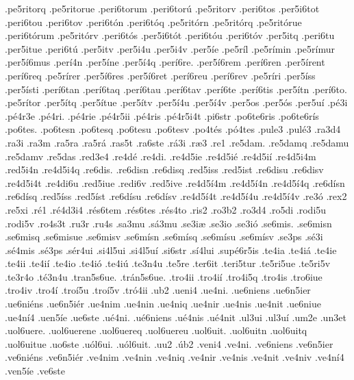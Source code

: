 {.pe5ritorq
.pe5ritorue
.peri6torum
.peri6tor^^fa
.pe5ritorv
.peri6tos
.per5i6tot
.peri6tou
.peri6tov
.peri6t^^f3n
.peri6t^^f3q
.pe5rit^^f3rn
.pe5rit^^f3rq
.pe5rit^^f3rue
.peri6t^^f3rum
.pe5rit^^f3rv
.peri6t^^f3s
.per5i6t^^f3t
.peri6t^^f3u
.peri6t^^f3v
.per5itq
.peri6tu
.per5itue
.peri6t^^fa
.per5itv
.per5i4u
.per5i4v
.per5^^ede
.pe5r^^edl
.pe5r^^edmin
.pe5r^^edmur
.per5^^ed6mus
.per^^ed4n
.per5^^edne
.per5^^ed4q
.per^^ed6re.
.per5^^ed6rem
.per^^ed6ren
.per5^^edrent
.per^^ed6req
.pe5r^^edrer
.per5^^ed6res
.per5^^ed6ret
.per^^ed6reu
.per^^ed6rev
.pe5r^^edri
.per5^^edss
.per5^^edsti
.per^^ed6tan
.per^^ed6taq
.per^^ed6tau
.per^^ed6tav
.per^^ed6te
.per^^ed6tis
.per5^^edtn
.per^^ed6to.
.pe5r^^edtor
.per5^^edtq
.per5^^edtue
.per5^^edtv
.per5^^ed4u
.per5^^ed4v
.per5os
.per5^^f3s
.per5u^^ed
.p^^e93i
.p^^e94r3e
.p^^e94ri.
.p^^e94rie
.p^^e94r5ii
.p^^e94ris
.p^^e94r5i4t
.pi6str
.po6te6ris
.po6te6r^^eds
.po6tes.
.po6tesn
.po6tesq
.po6tesu
.po6tesv
.po4t^^e9s
.p^^f34tes
.pule3
.pul^^e93
.ra3d4
.ra3i
.ra3m
.ra5ra
.ra5r^^e1
.ras5t
.ra6ste
.r^^e13i
.r^^e63
.re1
.re5dam.
.re5damq
.re5damu
.re5damv
.re5das
.red3e4
.re4d^^e9
.re4di.
.re4d5ie
.re4d5i^^e9
.re4d5i^^ed
.re4d5i4m
.red5i4n
.re4d5i4q
.re6dis.
.re6disn
.re6disq
.red5iss
.red5ist
.re6disu
.re6disv
.re4d5i4t
.re4di6u
.red5iue
.redi6v
.red5ive
.re4d5^^ed4m
.re4d5^^ed4n
.re4d5^^ed4q
.re6d^^edsn
.re6d^^edsq
.red5^^edss
.red5^^edst
.re6d^^edsu
.re6d^^edsv
.re4d5^^ed4t
.re4d5^^ed4u
.re4d5^^ed4v
.re3^^f3
.rex2
.re5xi
.r^^e91
.r^^e94d3i4
.r^^e9s6tem
.r^^e9s6tes
.r^^e9s4to
.ris2
.ro3b2
.ro3d4
.ro5di
.rodi5u
.rodi5v
.ro4s3t
.ru3r
.ru4s
.sa3mu
.s^^e13mu
.se3i^^e6
.se3io
.se3i^^f3
.se6mis.
.se6misn
.se6misq
.se6misue
.se6misv
.se6m^^edsn
.se6m^^edsq
.se6m^^edsu
.se6m^^edsv
.se3ps
.s^^e93i
.s^^e94mis
.s^^e93ps
.s^^e9r4ui
.si4l5ui
.si4l5u^^ed
.si6str
.s^^ed4lui
.sup^^e96r5is
.te4ia
.te4i^^e1
.te4ie
.te4ii
.te4i^^ed
.te4io
.te4i^^f3
.te4i^^fa
.te3n4u
.te5re
.ter6it
.teri5tur
.te5ri5ue
.te5ri5v
.te3r4o
.t^^e93n4u
.tran5s6ue.
.tr^^e1n5s6ue.
.tro4ii
.tro4i^^ed
.tro4i5q
.tro4is
.tro6iue
.tro4iv
.tro4^^ed
.tro^^ed5u
.tro^^ed5v
.tr^^f34ii
.ub2
.ueni4
.ue4ni.
.ue6niens
.ue6n5ier
.ue6ni^^e9ns
.ue6n5i^^e9r
.ue4nim
.ue4nin
.ue4niq
.ue4nir
.ue4nis
.ue4nit
.ue6niue
.ue4n^^ed4
.uen5^^ede
.ue6ste
.u^^e94ni.
.u^^e96niens
.u^^e94nis
.u^^e94nit
.ul3ui
.ul3u^^ed
.um2e
.un3et
.uol6uere.
.uol6uerene
.uol6uereq
.uol6uereu
.uol6uit.
.uol6uitn
.uol6uitq
.uol6uitue
.uo6ste
.u^^f3l6ui.
.u^^f3l6uit.
.uu2
.^^fab2
.veni4
.ve4ni.
.ve6niens
.ve6n5ier
.ve6ni^^e9ns
.ve6n5i^^e9r
.ve4nim
.ve4nin
.ve4niq
.ve4nir
.ve4nis
.ve4nit
.ve4niv
.ve4n^^ed4
.ven5^^ede
.ve6ste
}
